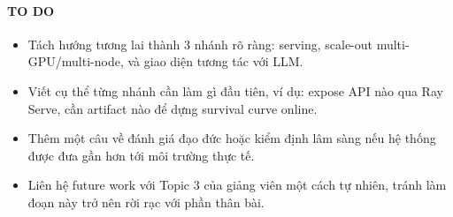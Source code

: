 \paragraph{TO DO}
\begin{itemize}
    \item Tách hướng tương lai thành 3 nhánh rõ ràng: serving, scale-out multi-GPU/multi-node, và giao diện tương tác với LLM.
    \item Viết cụ thể từng nhánh cần làm gì đầu tiên, ví dụ: expose API nào qua Ray Serve, cần artifact nào để dựng survival curve online.
    \item Thêm một câu về đánh giá đạo đức hoặc kiểm định lâm sàng nếu hệ thống được đưa gần hơn tới môi trường thực tế.
    \item Liên hệ future work với Topic 3 của giảng viên một cách tự nhiên, tránh làm đoạn này trở nên rời rạc với phần thân bài.
\end{itemize}